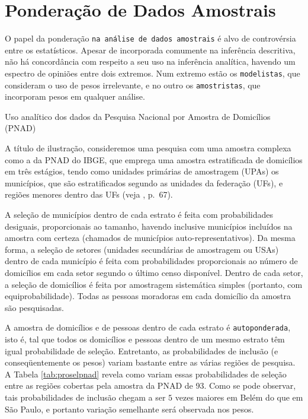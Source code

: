 \documentclass[]{book}
\theoremstyle{definition}
\theoremstyle{definition}
\theoremstyle{definition}
\theoremstyle{remark}
\let\BeginKnitrBlock\begin \let\EndKnitrBlock\end
\begin{document}
\section{Ponderação de Dados
Amostrais}\label{ponderacao-de-dados-amostrais}

O papel da ponderação \texttt{na\ análise\ de\ dados\ amostrais} é alvo
de controvérsia entre os estatísticos. Apesar de incorporada comumente
na inferência descritiva, não há concordância com respeito a seu uso na
inferência analítica, havendo um espectro de opiniões entre dois
extremos. Num extremo estão os \texttt{modelistas}, que consideram o uso
de pesos irrelevante, e no outro os \texttt{amostristas}, que incorporam
pesos em qualquer análise.

\BeginKnitrBlock{example}
\protect\hypertarget{exm:pnad}{}{\label{exm:pnad} }Uso analítico dos dados
da Pesquisa Nacional por Amostra de Domicílios (PNAD)
\EndKnitrBlock{example}

A título de ilustração, consideremos uma pesquisa com uma amostra
complexa como a da PNAD do IBGE, que emprega uma amostra estratificada
de domicílios em três estágios, tendo como unidades primárias de
amostragem (UPAs) os municípios, que são estratificados segundo as
unidades da federação (UFs), e regiões menores dentro das UFs (veja
\citep{IBGE81}, p.~67).

A seleção de municípios dentro de cada estrato é feita com
probabilidades desiguais, proporcionais ao tamanho, havendo inclusive
municípios incluídos na amostra com certeza (chamados de municípios
auto-representativos). Da mesma forma, a seleção de setores (unidades
secundárias de amostragem ou USAs) dentro de cada município é feita com
probabilidades proporcionais ao número de domicílios em cada setor
segundo o último censo disponível. Dentro de cada setor, a seleção de
domicílios é feita por amostragem sistemática simples (portanto, com
equiprobabilidade). Todas as pessoas moradoras em cada domicílio da
amostra são pesquisadas.

A amostra de domicílios e de pessoas dentro de cada estrato é
\texttt{autoponderada}, isto é, tal que todos os domicílios e pessoas
dentro de um mesmo estrato têm igual probabilidade de seleção.
Entretanto, as probabilidades de inclusão (e conseqüentemente os pesos)
variam bastante entre as várias regiões de pesquisa. A Tabela
\ref{tab:proselpnad} revela como variam essas probabilidades de seleção
entre as regiões cobertas pela amostra da PNAD de 93. Como se pode
observar, tais probabilidades de inclusão chegam a ser \(5\) vezes
maiores em Belém do que em São Paulo, e portanto variação semelhante
será observada nos pesos.
\end{document}
